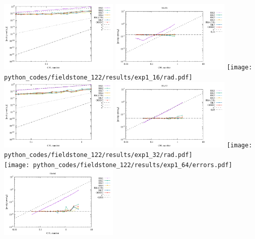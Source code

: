 \begin{center}
\includegraphics[width=5.7cm]{python_codes/fieldstone_122/results/exp1_16/errors.pdf}
\includegraphics[width=5.7cm]{python_codes/fieldstone_122/results/exp1_16/errors2.pdf}
\texttt{[image: python\_codes/fieldstone\_122/results/exp1\_16/rad.pdf]}\\
\includegraphics[width=5.7cm]{python_codes/fieldstone_122/results/exp1_32/errors.pdf}
\includegraphics[width=5.7cm]{python_codes/fieldstone_122/results/exp1_32/errors2.pdf}
\texttt{[image: python\_codes/fieldstone\_122/results/exp1\_32/rad.pdf]}\\
\texttt{[image: python\_codes/fieldstone\_122/results/exp1\_64/errors.pdf]}
\includegraphics[width=5.7cm]{python_codes/fieldstone_122/results/exp1_64/errors2.pdf}

\end{center}
